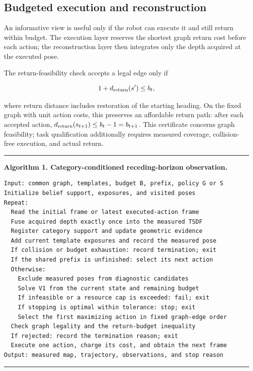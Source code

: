 \documentclass[11pt,a4paper]{article}
\providecommand{\hypertarget}[2]{#2}
\begin{document}
\hypertarget{budgeted-execution-and-reconstruction}{%
\subsection{Budgeted execution and reconstruction}\label{budgeted-execution-and-reconstruction}}

An informative view is useful only if the robot can execute it and still return within budget. The execution layer reserves the shortest graph return cost before each action; the reconstruction layer then integrates only the depth acquired at the executed pose.

The return-feasibility check accepts a legal edge only if

\[
1+d_{\rm return}(s')\le b_t,
\]

where return distance includes restoration of the starting heading. On the fixed graph with unit action costs, this preserves an affordable return path: after each accepted action, \(d_{\rm return}(s_{t+1})\le b_t-1=b_{t+1}\). This certificate concerns graph feasibility; task qualification additionally requires measured coverage, collision-free execution, and actual return.

\par\medskip\noindent\begin{minipage}{\linewidth}
\small\hrule\vspace{0.6em}
\textbf{Algorithm 1. Category-conditioned receding-horizon observation.}

\begin{verbatim}
Input: common graph, templates, budget B, prefix, policy G or S
Initialize belief support, exposures, and visited poses
Repeat:
  Read the initial frame or latest executed-action frame
  Fuse acquired depth exactly once into the measured TSDF
  Register category support and update geometric evidence
  Add current template exposures and record the measured pose
  If collision or budget exhaustion: record termination; exit
  If the shared prefix is unfinished: select its next action
  Otherwise:
    Exclude measured poses from diagnostic candidates
    Solve V1 from the current state and remaining budget
    If infeasible or a resource cap is exceeded: fail; exit
    If stopping is optimal within tolerance: stop; exit
    Select the first maximizing action in fixed graph-edge order
  Check graph legality and the return-budget inequality
  If rejected: record the termination reason; exit
  Execute one action, charge its cost, and obtain the next frame
Output: measured map, trajectory, observations, and stop reason
\end{verbatim}
\vspace{0.4em}\hrule
\end{minipage}\par\medskip
\end{document}
